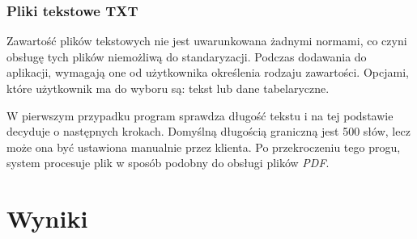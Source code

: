 \documentclass[12pt,a4paper,twoside]{article}
\begin{document}
\subsubsection*{Pliki tekstowe TXT}
Zawartość plików tekstowych nie jest uwarunkowana żadnymi normami, co czyni obsługę tych plików niemożliwą do standaryzacji. Podczas dodawania do aplikacji, wymagają one od użytkownika określenia rodzaju zawartości. Opcjami, które użytkownik ma do wyboru są: tekst lub dane tabelaryczne.\par
W pierwszym przypadku program sprawdza długość tekstu i na tej podstawie decyduje o następnych krokach. Domyślną długością graniczną jest 500 słów, lecz może ona być ustawiona manualnie przez klienta. Po przekroczeniu tego progu, system procesuje plik w sposób podobny do obsługi plików \textit{PDF}.\par
\newpage
\section{Wyniki}
\end{document}
